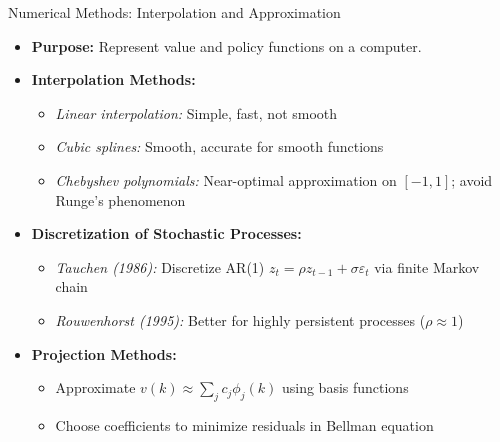 \begin{frame}{Numerical Methods: Interpolation and Approximation}
\begin{itemize}
\item \textbf{Purpose:} Represent value and policy functions on a computer.

\medskip
\item \textbf{Interpolation Methods:}
\begin{itemize}
    \item \emph{Linear interpolation:} Simple, fast, not smooth
    \item \emph{Cubic splines:} Smooth, accurate for smooth functions
    \item \emph{Chebyshev polynomials:} Near-optimal approximation on $[-1,1]$; avoid Runge's phenomenon
\end{itemize}

\medskip
\item \textbf{Discretization of Stochastic Processes:}
\begin{itemize}
    \item \emph{Tauchen (1986):} Discretize AR(1) $z_t = \rho z_{t-1} + \sigma \varepsilon_t$ via finite Markov chain
    \item \emph{Rouwenhorst (1995):} Better for highly persistent processes ($\rho \approx 1$)
\end{itemize}

\medskip
\item \textbf{Projection Methods:}
\begin{itemize}
    \item Approximate $v(k) \approx \sum_j c_j \phi_j(k)$ using basis functions
    \item Choose coefficients to minimize residuals in Bellman equation
\end{itemize}
\end{itemize}
\end{frame}

